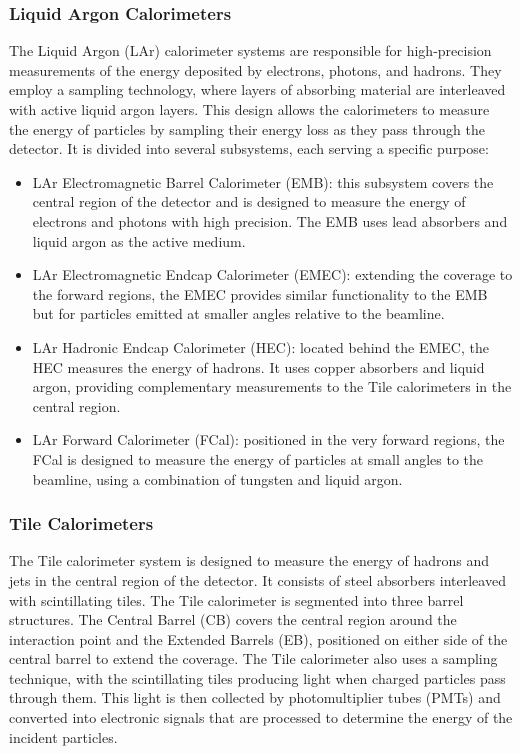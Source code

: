         \subsubsection{Liquid Argon Calorimeters}
            The Liquid Argon (LAr) calorimeter systems are responsible for high-precision measurements 
            of the energy deposited by electrons, photons, and hadrons. 
            They employ a sampling technology, where layers of absorbing material are 
            interleaved with active liquid argon layers. This design allows the calorimeters to measure 
            the energy of particles by sampling their energy loss as they pass through the detector.
            It is divided into several subsystems, each serving a specific purpose:
            \begin{itemize}
            \item LAr Electromagnetic Barrel Calorimeter (EMB): this subsystem covers the central region of the detector and is designed to measure the energy of electrons and photons with high precision. The EMB uses lead absorbers and liquid argon as the active medium.
            \item LAr Electromagnetic Endcap Calorimeter (EMEC): extending the coverage to the forward regions, the EMEC provides similar functionality to the EMB but for particles emitted at smaller angles relative to the beamline.
            \item LAr Hadronic Endcap Calorimeter (HEC): located behind the EMEC, the HEC measures the energy of hadrons. It uses copper absorbers and liquid argon, providing complementary measurements to the Tile calorimeters in the central region.
            \item LAr Forward Calorimeter (FCal): positioned in the very forward regions, the FCal is designed to measure the energy of particles at small angles to the beamline, using a combination of tungsten and liquid argon.
            \end{itemize}

        \subsubsection{Tile Calorimeters}
            The Tile calorimeter system is designed to measure the energy of hadrons and jets in the central 
            region of the detector. It consists of steel absorbers interleaved with scintillating tiles. 
            The Tile calorimeter is segmented into three barrel structures. 
            The Central Barrel (CB) covers the central region around the interaction point and the Extended
            Barrels (EB), positioned on either side of the central barrel to extend the coverage.
            The Tile calorimeter also uses a sampling technique, with the scintillating tiles producing light when 
            charged particles pass through them. This light is then collected by photomultiplier tubes (PMTs) and 
            converted into electronic signals that are processed to determine the energy of the incident particles.
